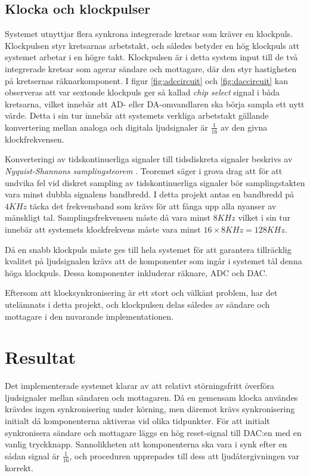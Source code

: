 \documentclass[a4paper,10pt]{article}
\begin{document}
\subsection{Klocka och klockpulser}

Systemet utnyttjar flera synkrona integrerade kretsar som kräver en
klockpuls. Klockpulsen styr kretsarnas arbetstakt, och således betyder en hög 
klockpuls att systemet arbetar i en högre takt. Klockpulsen är i detta system 
input till de två integrerade kretsar som agerar sändare och mottagare, där den 
styr hastigheten på kretsernas räknarkomponent. I figur \ref{fig:adccircuit} och 
\ref{fig:daccircuit} kan observeras att var sextonde klockpuls ger så kallad 
\textit{chip select} signal i båda kretsarna, vilket innebär att AD- eller 
DA-omvandlaren ska börja sampla ett nytt värde. Detta i sin tur innebär att 
systemets verkliga arbetstakt gällande konvertering mellan analoga och digitala 
ljudsignaler är $\frac{1}{16}$ av den givna klockfrekvensen.

Konverteringi av tidskontinuerliga signaler till tidsdiskreta signaler beskrivs 
av \textit{Nyquist-Shannons samplingsteorem} \cite{sampling}. Teoremet säger i 
grova drag att för att undvika fel vid diskret sampling av tidskontinuerliga 
signaler bör samplingstakten vara minst dubbla signalens bandbredd. I detta 
projekt antas en bandbredd på $4KHz$ täcka det frekvensband som krävs för att 
fånga upp alla nyanser av mänskligt tal. Samplingsfrekvensen måste då vara 
minst $8KHz$ vilket i sin tur innebär att systemets klockfrekvens måste vara 
minst $16 \times 8KHz = 128KHz$.

Då en snabb klockpuls måste ges till hela systemet för att garantera tillräcklig 
kvalitet på ljudsignalen krävs att de komponenter som ingår i systemet tål denna 
höga klockpuls. Dessa komponenter inkluderar räknare, ADC och DAC.

Eftersom att klocksynkronisering är ett stort och välkänt problem, har det 
utelämnats i detta projekt, och klockpulsen delas således av sändare och 
mottagare i den nuvarande implementationen. 


\section{Resultat}

Det implementerade systemet klarar av att relativt störningsfritt överföra 
ljudsignaler mellan sändaren och mottagaren. Då en gemensam klocka användes 
krävdes ingen synkronisering under körning, men däremot krävs synkronisering 
initialt då komponenterna aktiveras vid olika tidpunkter. För att initialt 
synkronisera sändare och mottagare läggs en hög reset-signal till DAC:en 
med en vanlig tryckknapp. Sannolikheten att komponenterna ska vara i synk efter 
en sådan signal är $\frac{1}{16}$, och proceduren upprepades till dess att 
ljudåtergivningen var korrekt. 
\end{document}
